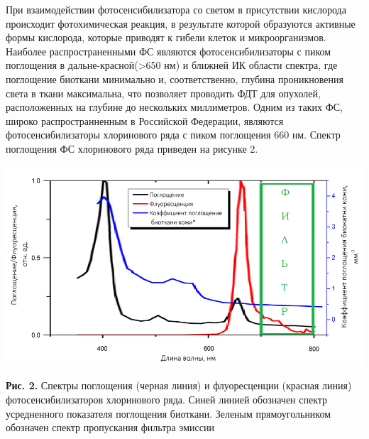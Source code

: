 \documentclass[a4paper,14pt]{extarticle}
\begin{document}
При взаимодействии фотосенсибилизатора со светом в присутствии кислорода происходит фотохимическая реакция, в результате которой образуются активные формы кислорода, которые приводят к гибели клеток и микроорганизмов.
Наиболее распространенными ФС являются фотосенсибилизаторы с пиком поглощения в дальне-красной(>650 нм) и ближней ИК области спектра, где поглощение биоткани минимально и, соответственно, глубина проникновения света в ткани максимальна, что позволяет проводить ФДТ для опухолей, расположенных на глубине до нескольких миллиметров. Одним из таких ФС, широко распространненным в Российской Федерации, являются фотосенсибилизаторы хлоринового ряда с пиком поглощения 660 нм. Спектр поглощения ФС хлоринового ряда приведен на рисунке 2. 


\begin{center}
    \includegraphics[scale = 0.6]{spektr.png}
    
    \textbf{Рис. 2.} Спектры поглощения (черная линия) и флуоресценции (красная линия) фотосенсибилизаторов хлоринового ряда. Синей линией обозначен спектр усредненного показателя поглощения биоткани. Зеленым прямоугольником обозначен спектр пропускания фильтра эмиссии
\end{center}
\end{document}
